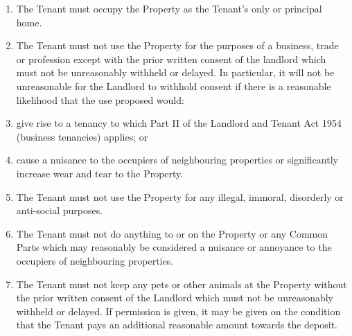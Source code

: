 \begin{enumerate}
\item{The Tenant must occupy the Property as the Tenant's only or principal home.}
\item{The Tenant must not use the Property for the purposes of a business, trade or profession except with the prior written consent of the landlord which must not be unreasonably withheld or delayed. In particular, it will not be unreasonable for the Landlord to withhold consent if there is a reasonable likelihood that the use proposed would:}
\item{give rise to a tenancy to which Part II of the Landlord and Tenant Act 1954 (business tenancies) applies; or}
\item{cause a nuisance to the occupiers of neighbouring properties or significantly increase wear and tear to the Property.}
\item{The Tenant must not use the Property for any illegal, immoral, disorderly or anti-social purposes.}
\item{The Tenant must not do anything to or on the Property or any Common Parts which may reasonably be considered a nuisance or annoyance to the occupiers of neighbouring properties.}



\item{The Tenant must not keep any pets or other animals at the Property without the prior written consent of the Landlord which must not be unreasonably withheld or delayed. If permission is given, it may be given on the condition that the Tenant pays an additional reasonable amount towards the deposit.}
\end{enumerate}


